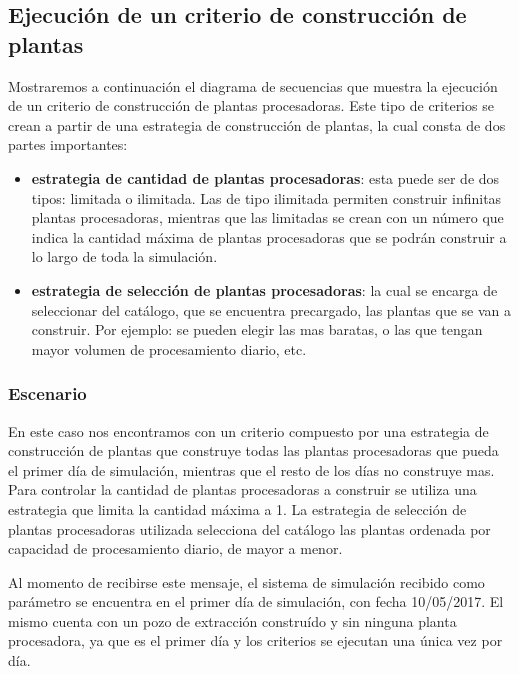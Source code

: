 \subsection{Ejecución de un criterio de construcción de plantas}

\par Mostraremos a continuación el diagrama de secuencias que muestra la ejecución de un criterio de construcción de plantas procesadoras. Este tipo de criterios se crean a partir de una estrategia de construcción de plantas, la cual consta de dos partes importantes:

\begin{itemize}
  \item \textbf{estrategia de cantidad de plantas procesadoras}: esta puede ser de dos tipos: limitada o ilimitada. Las de tipo ilimitada permiten construir infinitas plantas procesadoras, mientras que las limitadas se crean con un número que indica la cantidad máxima de plantas procesadoras que se podrán construir a lo largo de toda la simulación.
  \item \textbf{estrategia de selección de plantas procesadoras}: la cual se encarga de seleccionar del catálogo, que se encuentra precargado, las plantas que se van a construir. Por ejemplo: se pueden elegir las mas baratas, o las que tengan mayor volumen de procesamiento diario, etc.
\end{itemize}

\subsubsection{Escenario}
\par En este caso nos encontramos con un criterio compuesto por una estrategia de construcción de plantas que construye todas las plantas procesadoras que pueda el primer día de simulación, mientras que el resto de los días no construye mas. Para controlar la cantidad de plantas procesadoras a construir se utiliza una estrategia que limita la cantidad máxima a 1. La estrategia de selección de plantas procesadoras utilizada selecciona del catálogo las plantas ordenada por capacidad de procesamiento diario, de mayor a menor.
\par Al momento de recibirse este mensaje, el sistema de simulación recibido como parámetro se encuentra en el primer día de simulación, con fecha 10/05/2017. El mismo cuenta con un pozo de extracción construído y sin ninguna planta procesadora, ya que es el primer día y los criterios se ejecutan una única vez por día.

